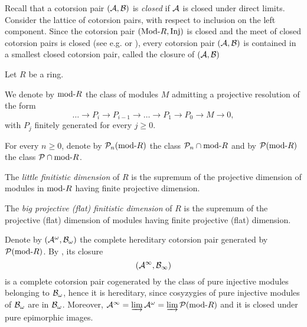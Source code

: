  Recall that a cotorsion pair  $(\mathcal{A}, \mathcal{B})$ is \emph{closed} if $\mathcal{A}$ is closed under direct limits. Consider the lattice of cotorsion pairs, with respect to inclusion on the left component.
Since the cotorsion pair $(\mathrm{Mod}\textrm{-}{R}, \mathrm{Inj})$ is closed and the meet of closed cotorsion pairs is closed (see e.g. \cite{AT} or \cite[Lemma 6.1]{G6}), every cotorsion pair $(\mathcal{A}, \mathcal{B})$ is contained in a smallest closed cotorsion pair, called the closure of $(\mathcal{A}, \mathcal{B})$
\begin{nota}\label{N:notations} Let $R$ be a ring.
\begin{enumerate}
\item We denote by $\mathrm{mod}\textrm{-}{R}$ the class of modules $M$ admitting a projective resolution of the form
\[\dots\to P_i\to P_{i-1}\to \dots\to P_1\to P_0\to M\to 0,\]
with $P_j$ finitely generated  for every $j \geq 0$.
\begin{sloppypar}
\item For every $n\geq 0$, denote by $\mathcal{P}_n(\mathrm{mod}\textrm{-}{R})$  the class ${\mathcal{P}_n\cap\mathrm{mod}\textrm{-}{R}}$ and by $\mathcal{P}(\mathrm{mod}\textrm{-}{R})$  the class $ \mathcal{P}\cap\mathrm{mod}\textrm{-}{R}$.
\end{sloppypar}
%
\item The \emph{little finitistic dimension} of $R$ is the supremum of the projective dimension of modules in $\mathrm{mod}\textrm{-}{R}$ having finite projective dimension.
\item The \emph{big projective (flat) finitistic dimension}  of $R$ is  the supremum of the projective (flat) dimension of modules having finite projective (flat) dimension.
\item Denote by $(\mathcal{A}^{\omega}, \mathcal{B}_{\omega})$ the complete hereditary cotorsion pair generated by $\mathcal{P}(\mathrm{mod}\textrm{-}{R})$. By \cite[Theorem 2.3, Corollary 2.4]{AT}, its closure
\[(\mathcal{A}^{\infty}, \mathcal{B}_{\infty})
\]  is a complete cotorsion pair cogenerated by the class of pure injective modules belonging to $\mathcal{B}_{\omega}$, hence it is hereditary, since cosyzygies of pure injective modules of $\mathcal{B}_{\omega}$ are in $\mathcal{B}_{\omega}$. Moreover, $\mathcal{A}^{\infty}=\varinjlim \mathcal{A}^{\omega}=\varinjlim \mathcal{P}(\mathrm{mod}\textrm{-}{R})$ and it is closed under pure epimorphic images.
\end{enumerate}
\end{nota}

